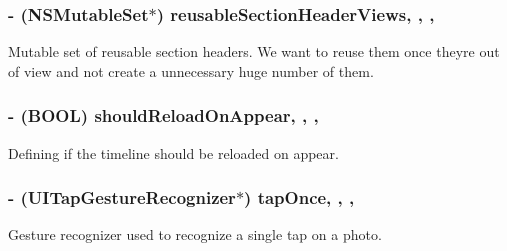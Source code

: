 \subsubsection[{reusable\+Section\+Header\+Views}]{\setlength{\rightskip}{0pt plus 5cm}-\/ (N\+S\+Mutable\+Set$\ast$) reusable\+Section\+Header\+Views\hspace{0.3cm}{\ttfamily [read]}, {\ttfamily [write]}, {\ttfamily [nonatomic]}, {\ttfamily [strong]}}\label{interface_e_s_popular_view_controller_ababc6cca18647ce1312ee3ad29d13475}
Mutable set of reusable section headers. We want to reuse them once they\textquotesingle{}re out of view and not create a unnecessary huge number of them. \hypertarget{interface_e_s_popular_view_controller_a9def789d7872f4d80f7218f6cca40f96}{}
\subsubsection[{should\+Reload\+On\+Appear}]{\setlength{\rightskip}{0pt plus 5cm}-\/ (B\+O\+O\+L) should\+Reload\+On\+Appear\hspace{0.3cm}{\ttfamily [read]}, {\ttfamily [write]}, {\ttfamily [nonatomic]}, {\ttfamily [assign]}}\label{interface_e_s_popular_view_controller_a9def789d7872f4d80f7218f6cca40f96}
Defining if the timeline should be reloaded on appear. \hypertarget{interface_e_s_popular_view_controller_adfe38ee30e074408c28b0decd81300fc}{}
\subsubsection[{tap\+Once}]{\setlength{\rightskip}{0pt plus 5cm}-\/ (U\+I\+Tap\+Gesture\+Recognizer$\ast$) tap\+Once\hspace{0.3cm}{\ttfamily [read]}, {\ttfamily [write]}, {\ttfamily [nonatomic]}, {\ttfamily [strong]}}\label{interface_e_s_popular_view_controller_adfe38ee30e074408c28b0decd81300fc}
Gesture recognizer used to recognize a single tap on a photo. \hypertarget{interface_e_s_popular_view_controller_a528b61c52344c48fdb8b34c522722b98}{}
